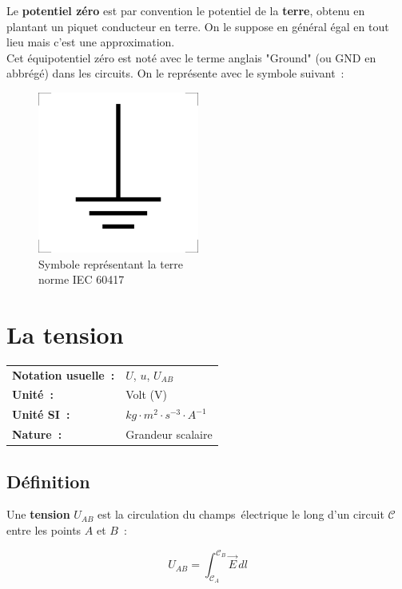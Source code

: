Le \textbf{potentiel zéro} est par convention le potentiel de la \textbf{terre}, obtenu en plantant un piquet conducteur en terre. On le suppose en général égal en tout lieu mais c'est une approximation. \\

Cet équipotentiel zéro est noté avec le terme anglais "Ground" (ou GND en abbrégé) dans les circuits. On le représente avec le symbole suivant~:

\begin{figure}[!h]
\centering
\includegraphics{part01/chap01/ground.png}
	\caption{Symbole représentant la terre \\ norme IEC 60417 }
\end{figure}


\section{La tension}

\begin{tabular}{ll}
\textbf{Notation usuelle~:} & $U$, $u$, $U_{AB}$ \\
\textbf{Unité~:} & Volt (V) \\
\textbf{Unité SI~:} & ${kg} \cdot m^2 \cdot {s}^{-3} \cdot A^{-1}$ \\
\textbf{Nature~:} & Grandeur scalaire \\
\end{tabular} 

\subsection*{Définition}

Une \textbf{tension} $U_{AB}$ est la circulation du champs électrique le long d'un circuit $\mathscr{C}$ entre les points $A$ et $B$~:

\begin{equation}
	U_{AB} = \int_{\mathscr{C}_{A}}^{\mathscr{C}_B}\vec{E}\,dl
\end{equation}

